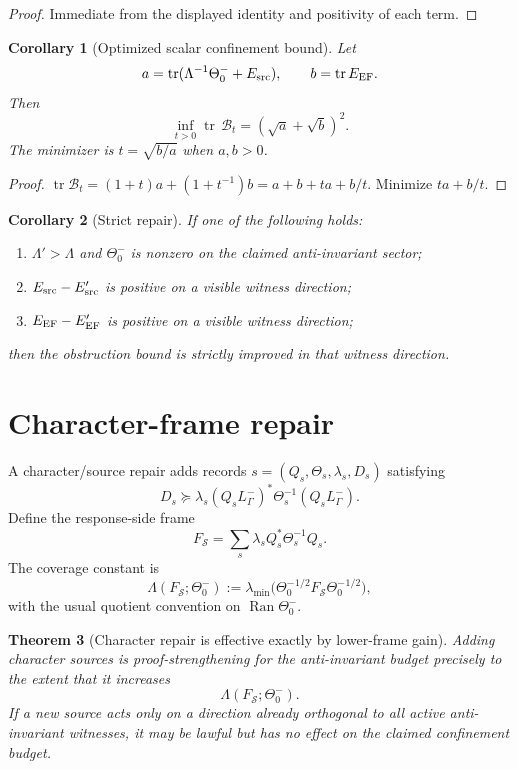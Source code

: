 \documentclass[11pt]{article}
\newtheorem{theorem}{Theorem}[section]
\newtheorem{corollary}[theorem]{Corollary}
\newcommand{\ThetaZero}{\Theta^-_0}
\newcommand{\EEF}{E_{\rm EF}}
\newcommand{\Esrc}{E_{\rm src}}
\newcommand{\Range}{\operatorname{Ran}}
\newcommand{\tr}{\operatorname{tr}}
\begin{document}
\begin{proof}
Immediate from the displayed identity and positivity of each term.
\end{proof}

\begin{corollary}[Optimized scalar confinement bound]
Let
\[
  a=\tr(\Lambda^{-1}\ThetaZero+\Esrc),
  \qquad
  b=\tr \EEF.
\]
Then
\[
  \inf_{t>0}\tr\,\mathcal B_t= (\sqrt a+\sqrt b)^2.
\]
The minimizer is $t=\sqrt{b/a}$ when $a,b>0$.
\end{corollary}

\begin{proof}
$\tr\mathcal B_t=(1+t)a+(1+t^{-1})b=a+b+ta+b/t$.  Minimize $ta+b/t$.
\end{proof}

\begin{corollary}[Strict repair]
If one of the following holds:
\begin{enumerate}[label=(\alph*)]
\item $\Lambda'>\Lambda$ and $\ThetaZero$ is nonzero on the claimed anti-invariant sector;
\item $\Esrc-\Esrc'$ is positive on a visible witness direction;
\item $\EEF-\EEF'$ is positive on a visible witness direction;
\end{enumerate}
then the obstruction bound is strictly improved in that witness direction.
\end{corollary}

\section{Character-frame repair}

A character/source repair adds records $s=(Q_s,\Theta_s,\lambda_s,D_s)$ satisfying
\[
  D_s\succeq \lambda_s(Q_sL^-_\Gamma)^*\Theta_s^{-1}(Q_sL^-_\Gamma).
\]
Define the response-side frame
\[
  F_{\mathcal S}=\sum_s \lambda_s Q_s^*\Theta_s^{-1}Q_s.
\]
The coverage constant is
\[
  \Lambda(F_{\mathcal S};\ThetaZero)
  :=\lambda_{\min}\bigl({\ThetaZero}^{1/2}F_{\mathcal S}{\ThetaZero}^{1/2}\bigr),
\]
with the usual quotient convention on $\Range\ThetaZero$.

\begin{theorem}[Character repair is effective exactly by lower-frame gain]
Adding character sources is proof-strengthening for the anti-invariant budget precisely to the extent that it increases
\[
  \Lambda(F_{\mathcal S};\ThetaZero).
\]
If a new source acts only on a direction already orthogonal to all active anti-invariant witnesses, it may be lawful but has no effect on the claimed confinement budget.
\end{theorem}
\end{document}
